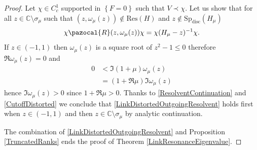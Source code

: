 \documentclass[a4paper, 12pt]{amsart}
\numberwithin{equation}{section}
\newcommand{\C}{\mathbb{C}} %
\newcommand{\Sp}{\mathrm{Sp}} %
\newcommand{\disc}{\mathrm{disc}} %
\newcommand{\Res}{\mathrm{Res}} %
\newcommand{\lcb}{\left\lbrace} %
\newcommand{\rcb}{\right\rbrace} %
\newcommand{\Rpaz}{\pazocal{R}}
\begin{document}
\begin{proof}
    Let $\chi\in C^1_c$ supported in $\lcb F=0\rcb$ such that $V\prec\chi$. Let us show that for all $z\in\C\setminus\sigma_\mu$ such that $(z,\omega_\mu(z))\not\in\Res(H)$ and $z\not\in\Sp_\disc(H_\mu)$
    \begin{equation}\label{LinkDistortedOutgoingResolvent}
        \chi\Rpaz(z,\omega_\mu(z))\chi=\chi(H_\mu-z)^{-1}\chi.
    \end{equation}
    If $z\in(-1,1)$ then $\omega_\mu(z)$ is a square root of $z^2-1\leq 0$ therefore $\Re\omega_\mu(z)=0$ and 
    \begin{align*}
        0&<\Im(1+\mu)\omega_\mu(z)\\
        &=(1+\Re\mu)\Im\omega_\mu(z)
    \end{align*}
    hence $\Im\omega_\mu(z)>0$ since $1+\Re\mu>0$. Thanks to \eqref{ResolventContinuation} and \eqref{CutoffDistorted} we conclude that \eqref{LinkDistortedOutgoingResolvent} holds first when $z\in(-1,1)$ and then $z\in\C\setminus\sigma_\mu$ by analytic continuation.
    
    The combination of \eqref{LinkDistortedOutgoingResolvent} and Proposition \ref{TruncatedRanks} ends the proof of Theorem \ref{LinkResonanceEigenvalue}.
\end{proof} 
\end{document}
